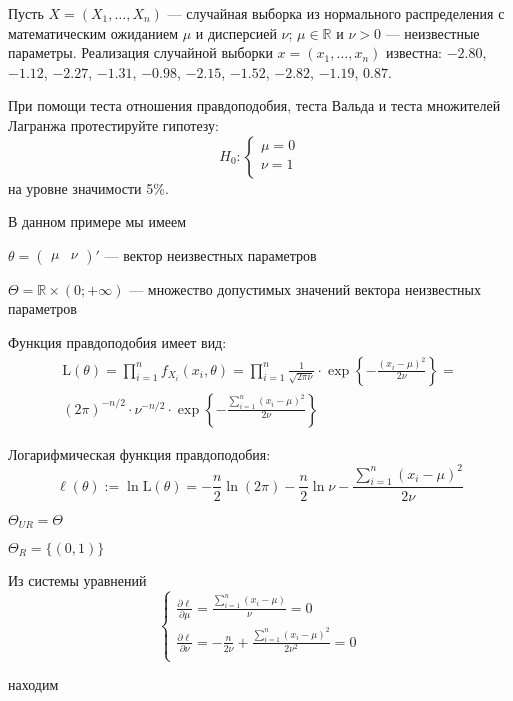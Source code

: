 \begin{problem}
Пусть $X = (X_1,\ldots,X_n)$ — случайная выборка из нормального распределения с математическим ожиданием $\mu$ и дисперсией $\nu$; $\mu \in \mathbb{R}$ и $\nu >0$ — неизвестные параметры. Реализация случайной выборки $x = (x_1,\ldots,x_n)$ известна: $-2.80$, $-1.12$, $-2.27$, $-1.31$, $-0.98$, $-2.15$, $-1.52$, $-2.82$, $-1.19$, $0.87$.


При помощи теста отношения правдоподобия, теста Вальда и теста множителей Лагранжа протестируйте гипотезу:
\[
H_0: \begin{cases}
\mu = 0 \\
\nu = 1 \\
\end{cases}
\]
на уровне значимости 5\%.


\begin{sol}
В данном примере мы имеем

$\theta = \begin{pmatrix}
\mu & \nu
\end{pmatrix}'$ — вектор неизвестных параметров

$\Theta = \mathbb{R} \times (0; +\infty)$ — множество допустимых значений вектора неизвестных параметров

Функция правдоподобия имеет вид:
\begin{multline*}
\text{L}(\theta) = \prod_{i=1}^n f_{X_i}(x_i, \theta) = \prod_{i=1}^n \frac{1}{\sqrt{2\pi\nu}} \cdot \exp\left\lbrace -\frac{(x_i - \mu)^2}{2\nu} \right\rbrace =\\
 (2\pi)^{-n/2} \cdot \nu^{-n/2} \cdot \exp \left\lbrace -\frac{\sum_{i=1}^n (x_i - \mu)^2}{2\nu} \right\rbrace
\end{multline*}

Логарифмическая функция правдоподобия:
\[
\ell(\theta) := \ln \text{L}(\theta) = -\frac{n}{2} \ln(2\pi) - \frac{n}{2} \ln\nu - \frac{\sum_{i=1}^n (x_i - \mu)^2}{2\nu}
\]

$\Theta_{UR} = \Theta$

$\Theta_{R} = \{(0,1)\}$

Из системы уравнений
\[
\begin{cases}
\frac{\partial \ell}{\partial \mu} = \frac{\sum_{i=1}^n (x_i - \mu)}{\nu} = 0 \\
\frac{\partial \ell}{\partial \nu} = -\frac{n}{2\nu} + \frac{\sum_{i=1}^n (x_i - \mu)^2}{2\nu^2} = 0 \\
\end{cases}
\]

находим


\end{sol}
\end{problem}
